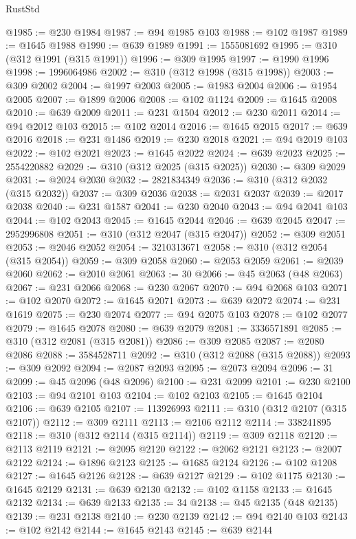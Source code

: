 \begin{lexlean}{RustStd}
\begin{coremodule}
{\begin{coremodule}
{{{{{{{{{{{{{{{{{{{{{{{{{{{{{{{{{{{{{@1985 := @230 @1984
@1987 := @94 @1985 @103
@1988 := @102 @1987
@1989 := @1645 @1988
@1990 := @639 @1989
@1991 := 1555081692
@1995 := @310 (@312 @1991 (@315 @1991))
@1996 := @309 @1995
@1997 := @1990 @1996
@1998 := 1996064986
@2002 := @310 (@312 @1998 (@315 @1998))
@2003 := @309 @2002
@2004 := @1997 @2003
@2005 := @1983 @2004
@2006 := @1954 @2005
@2007 := @1899 @2006
@2008 := @102 @1124
@2009 := @1645 @2008
@2010 := @639 @2009
@2011 := @231 @1504
@2012 := @230 @2011
@2014 := @94 @2012 @103
@2015 := @102 @2014
@2016 := @1645 @2015
@2017 := @639 @2016
@2018 := @231 @1486
@2019 := @230 @2018
@2021 := @94 @2019 @103
@2022 := @102 @2021
@2023 := @1645 @2022
@2024 := @639 @2023
@2025 := 2554220882
@2029 := @310 (@312 @2025 (@315 @2025))
@2030 := @309 @2029
@2031 := @2024 @2030
@2032 := 2821834349
@2036 := @310 (@312 @2032 (@315 @2032))
@2037 := @309 @2036
@2038 := @2031 @2037
@2039 := @2017 @2038
@2040 := @231 @1587
@2041 := @230 @2040
@2043 := @94 @2041 @103
@2044 := @102 @2043
@2045 := @1645 @2044
@2046 := @639 @2045
@2047 := 2952996808
@2051 := @310 (@312 @2047 (@315 @2047))
@2052 := @309 @2051
@2053 := @2046 @2052
@2054 := 3210313671
@2058 := @310 (@312 @2054 (@315 @2054))
@2059 := @309 @2058
@2060 := @2053 @2059
@2061 := @2039 @2060
@2062 := @2010 @2061
@2063 := 30
@2066 := @45 @2063 (@48 @2063)
@2067 := @231 @2066
@2068 := @230 @2067
@2070 := @94 @2068 @103
@2071 := @102 @2070
@2072 := @1645 @2071
@2073 := @639 @2072
@2074 := @231 @1619
@2075 := @230 @2074
@2077 := @94 @2075 @103
@2078 := @102 @2077
@2079 := @1645 @2078
@2080 := @639 @2079
@2081 := 3336571891
@2085 := @310 (@312 @2081 (@315 @2081))
@2086 := @309 @2085
@2087 := @2080 @2086
@2088 := 3584528711
@2092 := @310 (@312 @2088 (@315 @2088))
@2093 := @309 @2092
@2094 := @2087 @2093
@2095 := @2073 @2094
@2096 := 31
@2099 := @45 @2096 (@48 @2096)
@2100 := @231 @2099
@2101 := @230 @2100
@2103 := @94 @2101 @103
@2104 := @102 @2103
@2105 := @1645 @2104
@2106 := @639 @2105
@2107 := 113926993
@2111 := @310 (@312 @2107 (@315 @2107))
@2112 := @309 @2111
@2113 := @2106 @2112
@2114 := 338241895
@2118 := @310 (@312 @2114 (@315 @2114))
@2119 := @309 @2118
@2120 := @2113 @2119
@2121 := @2095 @2120
@2122 := @2062 @2121
@2123 := @2007 @2122
@2124 := @1896 @2123
@2125 := @1685 @2124
@2126 := @102 @1208
@2127 := @1645 @2126
@2128 := @639 @2127
@2129 := @102 @1175
@2130 := @1645 @2129
@2131 := @639 @2130
@2132 := @102 @1158
@2133 := @1645 @2132
@2134 := @639 @2133
@2135 := 34
@2138 := @45 @2135 (@48 @2135)
@2139 := @231 @2138
@2140 := @230 @2139
@2142 := @94 @2140 @103
@2143 := @102 @2142
@2144 := @1645 @2143
@2145 := @639 @2144
}}}}}}}}}}}}}}}}}}}}}}}}}}}}}}}}}}}}}
\end{coremodule}}
\end{coremodule}
\end{lexlean}
